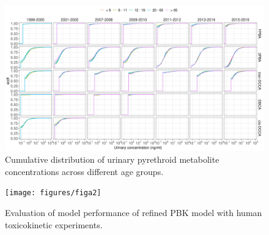 \documentclass[toxics,article,submit,pdftex,moreauthors]{Definitions/mdpi}
\begin{document}
\begin{figure}[H]
\begin{adjustwidth}{-4cm}{}
\includegraphics[width=\linewidth]{figures/figa1}
\hfill
\end{adjustwidth}
\caption{Cumulative distribution of urinary pyrethroid metabolite concentrations across different age groups.}\label{fig:figa1}
\end{figure}

\begin{figure}[H]
\begin{adjustwidth}{-4cm}{}
\texttt{[image: figures/figa2]}
\hfill
\end{adjustwidth}
\caption{Evaluation of model performance of refined PBK model with human toxicokinetic experiments.}\label{fig:figa2}
\end{figure}
\end{document}
